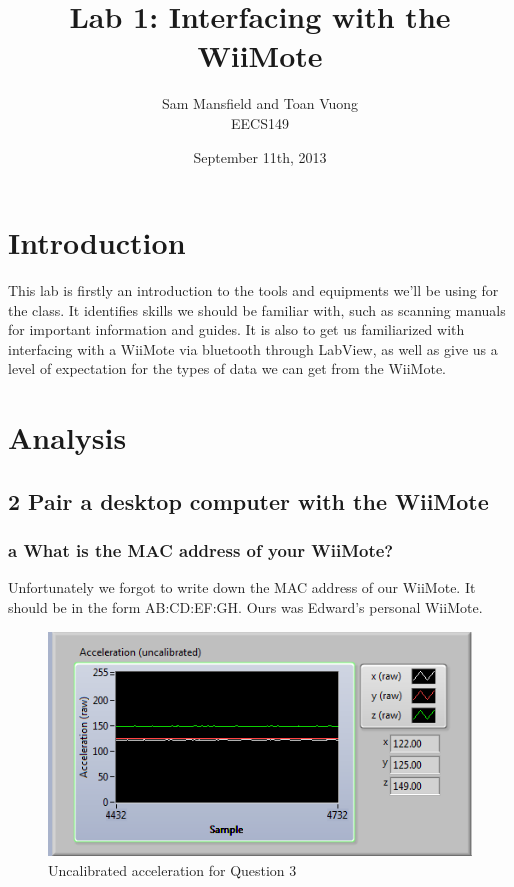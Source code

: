 \documentclass[10pt,a4paper]{article}
\begin{document}
\title{Lab 1: Interfacing with the WiiMote}
\author{Sam Mansfield and Toan Vuong \\
  EECS149}
\date{September 11th, 2013}
\maketitle

\section*{Introduction}
  This lab is firstly an introduction to the tools and equipments we'll be using for the class. It identifies skills we should be familiar with, such as scanning manuals for important information and guides. It is also to get us familiarized with interfacing with a WiiMote via bluetooth through LabView, as well as give us a level of expectation for the types of data we can get from the WiiMote.
\section*{Analysis}
  \subsection*{2 Pair a desktop computer with the WiiMote}
    \subsubsection*{a What is the MAC address of your WiiMote?}
      Unfortunately we forgot to write down the MAC address of our WiiMote. It should be in the form AB:CD:EF:GH. Ours was Edward's personal WiiMote.
    \begin{figure}[H]
        \centering
        \includegraphics{../lab1_data/lab1_3a.PNG}
        \caption{Uncalibrated acceleration for Question 3}
    \end{figure}
\end{document}
